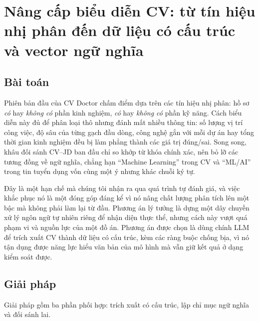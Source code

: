 \documentclass[../DoAn.tex]{subfiles}
\begin{document}
\section{Nâng cấp biểu diễn CV: từ tín hiệu nhị phân đến dữ liệu có cấu trúc và vector ngữ nghĩa}
\label{sec:ch5-structured}

\subsection{Bài toán}

Phiên bản đầu của CV Doctor chấm điểm dựa trên các tín hiệu nhị phân: hồ sơ \emph{có} hay \emph{không có} phần kinh nghiệm, \emph{có} hay \emph{không có} phần kỹ năng. Cách biểu diễn này đủ để phân loại thô nhưng đánh mất nhiều thông tin: số lượng vị trí công việc, độ sâu của từng gạch đầu dòng, công nghệ gắn với mỗi dự án hay tổng thời gian kinh nghiệm đều bị làm phẳng thành các giá trị đúng/sai. Song song, khâu đối sánh CV--JD ban đầu chỉ so khớp từ khóa chính xác, nên bỏ lỡ các tương đồng về ngữ nghĩa, chẳng hạn ``Machine Learning'' trong CV và ``ML/AI'' trong tin tuyển dụng vốn cùng một ý nhưng khác chuỗi ký tự.

Đây là một hạn chế mà chúng tôi nhận ra qua quá trình tự đánh giá, và việc khắc phục nó là một đóng góp đáng kể vì nó nâng chất lượng phân tích lên một bậc mà không phải làm lại từ đầu. Phương án lý tưởng là dựng một dây chuyền xử lý ngôn ngữ tự nhiên riêng để nhận diện thực thể, nhưng cách này vượt quá phạm vi và nguồn lực của một đồ án. Phương án được chọn là dùng chính LLM để trích xuất CV thành dữ liệu có cấu trúc, kèm các ràng buộc chống bịa, vì nó tận dụng được năng lực hiểu văn bản của mô hình mà vẫn giữ kết quả ở dạng kiểm soát được.

\subsection{Giải pháp}

Giải pháp gồm ba phần phối hợp: trích xuất có cấu trúc, lập chỉ mục ngữ nghĩa và đối sánh lai.
\end{document}
